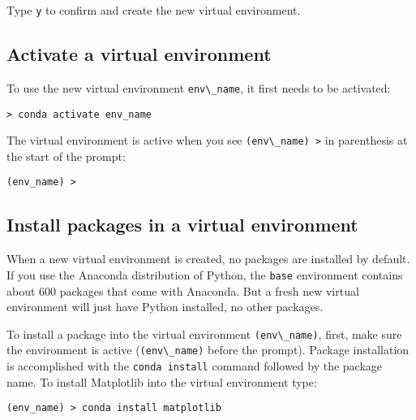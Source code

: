 \documentclass{book}
\newcommand{\passthrough}[1]{#1}
\begin{document}
Type \passthrough{\lstinline!y!} to confirm and create the new virtual
environment.
    




    
        \hypertarget{activate-a-virtual-environment}{%
\subsection{Activate a virtual
environment}\label{activate-a-virtual-environment}}

To use the new virtual environment \passthrough{\lstinline!env\_name!},
it first needs to be activated:

\begin{lstlisting}
> conda activate env_name
\end{lstlisting}

The virtual environment is active when you see
\passthrough{\lstinline!(env\_name) >!} in parenthesis at the start of
the prompt:

\begin{lstlisting}
(env_name) > 
\end{lstlisting}
    




    
        \hypertarget{install-packages-in-a-virtual-environment}{%
\subsection{Install packages in a virtual
environment}\label{install-packages-in-a-virtual-environment}}

When a new virtual environment is created, no packages are installed by
default. If you use the Anaconda distribution of Python, the
\passthrough{\lstinline!base!} environment contains about 600 packages
that come with Anaconda. But a fresh new virtual environment will just
have Python installed, no other packages.

To install a package into the virtual environment
\passthrough{\lstinline!(env\_name)!}, first, make sure the environment
is active (\passthrough{\lstinline!(env\_name)!} before the prompt).
Package installation is accomplished with the
\passthrough{\lstinline!conda install!} command followed by the package
name. To install Matplotlib into the virtual environment type:

\begin{lstlisting}
(env_name) > conda install matplotlib
\end{lstlisting}
\end{document}
